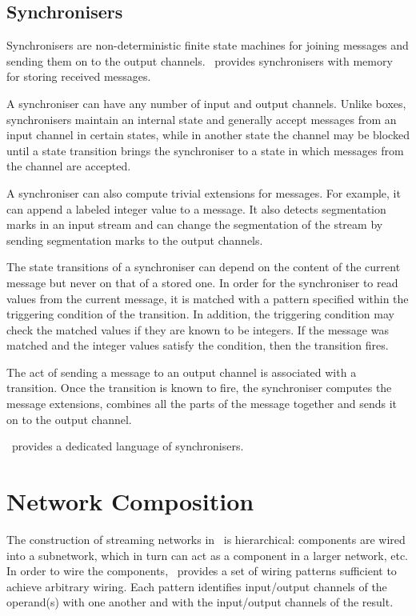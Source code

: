     \subsection*{Synchronisers}
Synchronisers are non-deterministic finite state machines for joining messages and sending them on to the output channels. \ak\ provides synchronisers with memory for storing received messages.

A synchroniser can have any number of input and output channels. Unlike boxes, synchronisers maintain an internal state and generally accept messages from an input channel in certain states, while in another state the channel may be blocked until a state transition brings the synchroniser to a state in which messages from the channel are accepted.

A synchroniser can also compute trivial extensions for messages. For example, it can append a labeled integer value to a message. It also detects segmentation marks in an input stream and can change the segmentation of the stream by sending segmentation marks to the output channels.

The state transitions of a synchroniser can depend on the content of the current message but never on that of a stored one. In order for the synchroniser to read values from the current message, it is matched with a pattern specified within the triggering condition of the transition. In addition, the triggering condition may check the matched values if they are known to be integers. If the message was matched and the integer values satisfy the condition, then the transition fires.

The act of sending a message to an output channel is associated with a transition. Once the transition is known to fire, the synchroniser computes the message extensions, combines all the parts of the message together and sends it on to the output channel.

\ak\ provides a dedicated language of synchronisers.


\section{Network Composition}
The construction of streaming networks in \ak\ is hierarchical: components are wired into a subnetwork, which in turn can act as a component in a larger network, etc. In order to wire the components, \ak\ provides a set of wiring patterns sufficient to achieve arbitrary wiring. Each pattern identifies input/output channels of the operand(s) with one another and with the input/output channels of the result.


